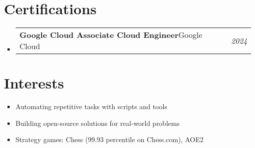 \documentclass[a4paper,11pt]{article}
\makeatletter
\newcommand{\resumePOR}[3]{
  \vspace{0.5mm}\item
  \begin{tabular*}{0.97\textwidth}[t]{l@{\extracolsep{\fill}}r}
    \textbf{#1}\hspace{0.3mm}#2 & \textit{\small{#3}}
  \end{tabular*}
  \vspace{-2mm}
}
\newcommand{\resumeSubHeadingListStart}{\begin{itemize}[leftmargin=*,labelsep=0mm]}
\newcommand{\resumeItemListStart}{\begin{itemize}[leftmargin=3ex, rightmargin=2ex, noitemsep,labelsep=1.2mm,itemsep=0mm]\small}
\newcommand{\resumeSubHeadingListEnd}{\end{itemize}\vspace{1mm}}
\newcommand{\resumeItemListEnd}{\end{itemize}\vspace{-2mm}}
\makeatother
\begin{document}
\section{Certifications}
\resumeSubHeadingListStart
  \resumePOR
    {Google Cloud Associate Cloud Engineer}
    {Google Cloud}
    {2024 \hspace{1em} \raisebox{-0.5mm}{\texttt{[image: badge.png]}}}
\resumeSubHeadingListEnd
\vspace{-4mm}

\section{Interests}
\resumeItemListStart
  \item Automating repetitive tasks with scripts and tools
  \item Building open-source solutions for real-world problems
  \item Strategy games: Chess (99.93 percentile on Chess.com), AOE2
\resumeItemListEnd

\end{document}
